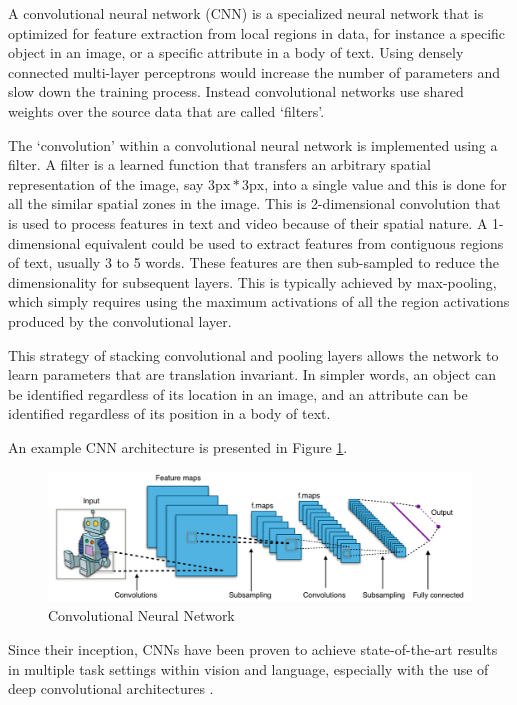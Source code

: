 A convolutional neural network (CNN) \cite{lecun1995convolutional} is a specialized neural network that is optimized for feature extraction from local regions in data, for instance a specific object in an image, or a specific attribute in a body of text. Using densely connected multi-layer perceptrons would increase the number of parameters and slow down the training process. Instead convolutional networks use shared weights over the source data that are called `filters'.

The `convolution' within a convolutional neural network is implemented using a filter. A filter is a learned function that transfers an arbitrary spatial representation of the image, say $3\text{px} * 3\text{px}$, into a single value and this is done for all the similar spatial zones in the image. This is 2-dimensional convolution that is used to process features in text and video because of their spatial nature. A 1-dimensional equivalent could be used to extract features from contiguous regions of text, usually 3 to 5 words. These features are then sub-sampled to reduce the dimensionality for subsequent layers. This is typically achieved by max-pooling, which simply requires using the maximum activations of all the region activations produced by the convolutional layer.

This strategy of stacking convolutional and pooling layers allows the network to learn parameters that are translation invariant. In simpler words, an object can be identified regardless of its location in an image, and an attribute can be identified regardless of its position in a body of text.

An example CNN architecture is presented in Figure \ref{fig:cnn}.

\begin{figure}[ht]
	\centering
	\includegraphics[width=\textwidth]{images/cnn}
	\caption{\label{fig:cnn} Convolutional Neural Network}
\end{figure}

Since their inception, CNNs have been proven to achieve state-of-the-art results in multiple task settings within vision and language, especially with the use of deep convolutional architectures \citep{lawrence1997face,krizhevsky2012imagenet,karpathy2014large,kalchbrenner2014convolutional,kim2014convolutional,hu2014convolutional}.


